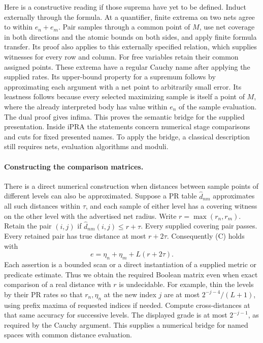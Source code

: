 Here is a constructive reading if those suprema have yet to be defined.
Induct externally through the formula. At a quantifier, finite extrema on
two nets agree to within $e_n+e_m$. Pair samples through a common point
of $M$, use net coverage in both directions and the atomic bounds on
both sides, and apply finite formula transfer. Its proof also applies to
this externally specified relation, which supplies witnesses for every
row and column. For free variables retain their common assigned points.
These extrema have a regular Cauchy name after applying the supplied
rates. Its upper-bound property for a supremum follows by approximating
each argument with a net point to arbitrarily small error. Its leastness
follows because every selected maximizing sample is itself a point of
$M$, where the already interpreted body has value within $e_n$ of the
sample evaluation. The dual proof gives infima. This proves the semantic
bridge for the supplied presentation. Inside iPRA the statements concern
numerical stage comparisons and cuts for fixed presented names. To apply
the bridge, a classical description still requires nets, evaluation
algorithms and moduli.

\paragraph{Constructing the comparison matrices.}
There is a direct numerical construction when distances between sample
points of different levels can also be approximated. Suppose a PR table
$\widehat d_{nm}$ approximates all such distances within $\tau$, and
each sample of either level has a covering witness on the other level
with the advertised net radius. Write $r=\max(r_n,r_m)$. Retain the
pair $(i,j)$ if $\widehat d_{nm}(i,j)\leq r+\tau$. Every supplied
covering pair passes. Every retained pair has true distance at most
$r+2\tau$. Consequently (C) holds with
\[
       e=\eta_n+\eta_m+L(r+2\tau).
\]
Each assertion is a bounded scan or a direct instantiation of a supplied
metric or predicate estimate. Thus we obtain the required Boolean
matrix even when exact comparison of a real distance with $r$ is
undecidable. For example, thin the levels by their PR rates so that
$r_n,\eta_n$ at the new index $j$ are at most
$2^{-j-4}/(L+1)$, using prefix maxima of requested indices if needed.
Compute cross-distances at that same accuracy for successive levels.
The displayed grade is at most $2^{-j-1}$, as required by the Cauchy
argument. This supplies a numerical bridge for named spaces with common
distance evaluation.

